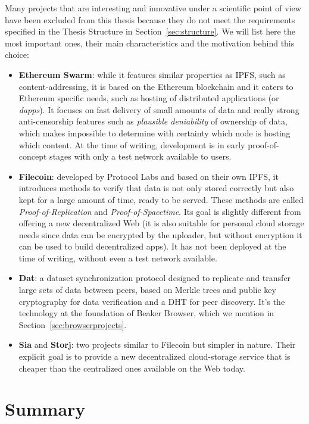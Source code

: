\documentclass[mscthesis]{usiinfthesis}
\begin{document}
Many projects that are interesting and innovative under a scientific point of view have been excluded from this thesis because they do not meet the requirements specified in the Thesis Structure in Section~\ref{sec:structure}. We will list here the most important ones, their main characteristics and the motivation behind this choice:
\begin{itemize}
	\item \textbf{Ethereum Swarm}: while it features similar properties as IPFS, such as content-addressing, it is based on the Ethereum blockchain and it caters to Ethereum specific needs, such as hosting of distributed applications (or \textit{dapps}). It focuses on fast delivery of small amounts of data and really strong anti-censorship features such as \textit{plausible deniability} of ownership of data, which makes impossible to determine with certainty which node is hosting which content. At the time of writing, development is in early proof-of-concept stages with only a test network available to users.
	\item \textbf{Filecoin}: developed by Protocol Labs and based on their own IPFS, it introduces methods to verify that data is not only stored correctly but also kept for a large amount of time, ready to be served. These methods are called \textit{Proof-of-Replication} and \textit{Proof-of-Spacetime}. Its goal is slightly different from offering a new decentralized Web (it is also suitable for personal cloud storage needs since data can be encrypted by the uploader, but without encryption it can be used to build decentralized apps). It has not been deployed at the time of writing, without even a test network available.
	\item \textbf{Dat}: a dataset synchronization protocol designed to replicate and transfer large sets of data between peers, based on Merkle trees and public key cryptography for data verification and a DHT for peer discovery. It's the technology at the foundation of Beaker Browser, which we mention in Section~\ref{sec:browserprojects}.
	\item \textbf{Sia} and \textbf{Storj}: two projects similar to Filecoin but simpler in nature. Their explicit goal is to provide a new decentralized cloud-storage service that is cheaper than the centralized ones available on the Web today.
\end{itemize}

\section{Summary}\label{sec:storagesummary}
\end{document}
